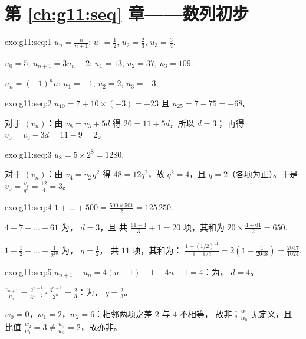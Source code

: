 \section*{第 \ref{ch:g11:seq} 章——数列初步}

\begin{solution}{exo:g11:seq:1}
$u_n = \frac{n}{n+1}$: $u_1 = \frac12$, $u_2 = \frac23$,
$u_3 = \frac34$.

$u_0 = 5$, $u_{n+1} = 3u_n - 2$: $u_1 = 13$, $u_2 = 37$, $u_3 = 109$.

$u_n = (-1)^n n$: $u_1 = -1$, $u_2 = 2$, $u_3 = -3$.
\end{solution}

\begin{solution}{exo:g11:seq:2}
$u_{10} = 7 + 10 \times (-3) = -23$ 且 $u_{25} = 7 - 75 = -68$。

对于 $(v_n)$：由 $v_8 = v_3 + 5d$ 得 $26 = 11 + 5d$，所以 $d = 3$；
再得 $v_0 = v_3 - 3d = 11 - 9 = 2$。
\end{solution}

\begin{solution}{exo:g11:seq:3}
$u_8 = 5 \times 2^8 = 1280$.

对于 $(v_n)$：由 $v_4 = v_2\, q^2$ 得 $48 = 12 q^2$，故 $q^2 = 4$，且
$q = 2$（各项为正）。于是
$v_0 = \frac{v_2}{q^2} = \frac{12}{4} = 3$。
\end{solution}

\begin{solution}{exo:g11:seq:4}
$1 + \dots + 500 = \frac{500 \times 501}{2} = 125\,250$.

$4 + 7 + \dots + 61$ 为， $d = 3$，且
共 $\frac{61 - 4}{3} + 1 = 20$ 项，其和为
$20 \times \frac{4 + 61}{2} = 650$.

$1 + \frac12 + \dots + \frac{1}{2^{10}}$ 为， $q = \frac12$，
共 $11$ 项，其和为：
$\frac{1 - (1/2)^{11}}{1 - 1/2} = 2\left(1 - \frac{1}{2048}\right)
= \frac{2047}{1024}$.
\end{solution}

\begin{solution}{exo:g11:seq:5}
$u_{n+1} - u_n = 4(n+1) - 1 - 4n + 1 = 4$：为， $d = 4$。

$\frac{v_{n+1}}{v_n} = \frac{2^{n+1}}{3^{n+2}} \cdot \frac{3^{n+1}}{2^n}
= \frac23$：为， $q = \frac23$。

$w_0 = 0$，$w_1 = 2$，$w_2 = 6$：相邻两项之差 $2$ 与 $4$ 不相等，
故非；$\frac{w_1}{w_0}$ 无定义，且
比值 $\frac{w_2}{w_1} = 3 \neq \frac{w_3}{w_2} = 2$，故亦非。
\end{solution}

